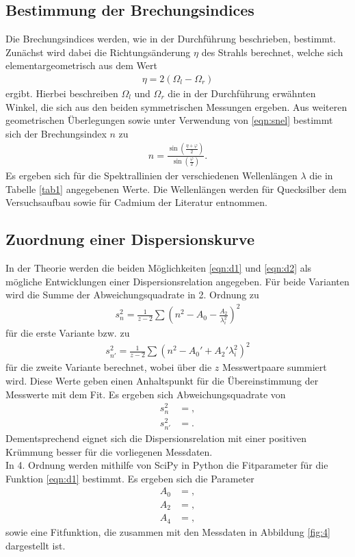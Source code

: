 \subsection{Bestimmung der Brechungsindices}
Die Brechungsindices werden, wie in der Durchführung beschrieben, bestimmt.
Zunächst wird dabei die Richtungsänderung $\eta$ des Strahls berechnet, welche sich elementargeometrisch aus dem Wert
\begin{align}
  \eta = 2 (\Omega_l - \Omega_r)
\end{align}
ergibt.
Hierbei beschreiben $\Omega_l$ und $\Omega_r$ die in der Durchführung erwähnten Winkel, die sich aus den beiden symmetrischen Messungen ergeben.
Aus weiteren geometrischen Überlegungen sowie unter Verwendung von \eqref{eqn:snel} bestimmt sich der Brechungsindex $n$ zu
\begin{align}
  n = \frac{\sin{(\frac{\eta + \varphi}{2})}}{\sin{(\frac{\varphi}{2})}}.
\end{align}
Es ergeben sich für die Spektrallinien der verschiedenen Wellenlängen $\lambda$ die in Tabelle \ref{tab1} angegebenen Werte.
Die Wellenlängen werden für Quecksilber dem Versuchsaufbau sowie für Cadmium der Literatur \cite{cd} entnommen.
    

\subsection{Zuordnung einer Dispersionskurve}
In der Theorie werden die beiden Möglichkeiten \eqref{eqn:d1} und \eqref{eqn:d2} als mögliche Entwicklungen einer Dispersionsrelation angegeben.
Für beide Varianten wird die Summe der Abweichungsquadrate in 2. Ordnung zu
\begin{align*}
  s_n^2 = \frac{1}{z-2} \sum ( n^2 - A_0 - \frac{A_2}{\lambda_i^2} )^2
\end{align*}
für die erste Variante bzw. zu
\begin{align*}
  s_{n'}^2 = \frac{1}{z-2} \sum ( n^2 - A_0' + A_2' \lambda_i^2 )^2
\end{align*}
für die zweite Variante berechnet, wobei über die $z$ Messwertpaare summiert wird.
Diese Werte geben einen Anhaltspunkt für die Übereinstimmung der Messwerte mit dem Fit.
Es ergeben sich Abweichungsquadrate von
\begin{align*}
  s_n^2 &= ,\\
  s_{n'}^2 &= .
\end{align*}
Dementsprechend eignet sich die Dispersionsrelation mit einer positiven Krümmung besser für die vorliegenen Messdaten.\\
In 4. Ordnung werden mithilfe von SciPy in Python die Fitparameter für die Funktion \eqref{eqn:d1} bestimmt.
Es ergeben sich die Parameter
\begin{align*}
A_0 &= ,\\
A_2 &= ,\\
A_4 &= ,
\end{align*}
sowie eine Fitfunktion, die zusammen mit den Messdaten in Abbildung \ref{fig:4} dargestellt ist.

